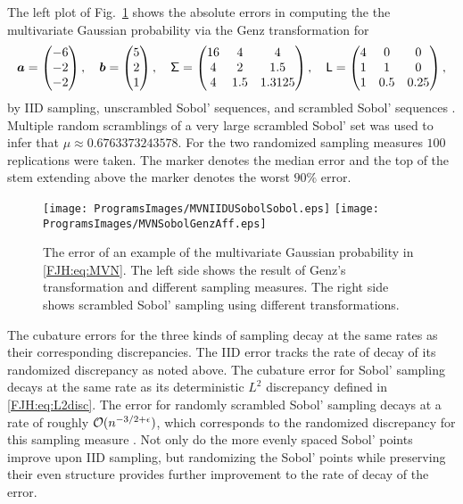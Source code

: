 \documentclass[graybox,footinfo]{svmult}
\begin{document}
The left plot of Fig.\ \ref{FJH:fig:MVNfig} shows the absolute errors in computing the the 
multivariate 
Gaussian probability via the Genz transformation for 
\[
   {\boldsymbol{a}}  = \begin{pmatrix}
   -6 \\ -2 \\ -2
   \end{pmatrix}, \quad
      {\boldsymbol{b}}  = \begin{pmatrix}
   5 \\ 2 \\ 1
   \end{pmatrix}, \quad
   \mathsf{\Sigma} = \begin{pmatrix} 16 & 4 & 4 \\ 4 &  2 &  1.5 \\
  4 & 1.5 &  1.3125 \end{pmatrix}, \quad
   \mathsf{L} = \begin{pmatrix} 4 & 0 & 0 \\ 1 &  1 &  0 \\
1 & 0.5 &  0.25 \end{pmatrix}, 
\]
by IID sampling, unscrambled Sobol' sequences, and scrambled Sobol' sequences   
\cite{Owe95, Owe98c}.
Multiple random scramblings of a very large scrambled Sobol' set was used to infer that 
$\mu \approx 0.6763373243578$.   For the two randomized sampling measures $100$ 
replications were taken.  The marker denotes the median error and the top of the stem 
extending above the marker denotes the worst $90\%$ error.

\begin{figure}
	\centering
	\texttt{[image: ProgramsImages/MVNIIDUSobolSobol.eps]} 
	\qquad 
	\texttt{[image: ProgramsImages/MVNSobolGenzAff.eps]}
	\caption{The error of an example of the multivariate Gaussian probability in 
	\eqref{FJH:eq:MVN}.  The left side shows the result of Genz's transformation and 
	different sampling measures.  The right side shows scrambled Sobol' sampling
	using different transformations.
	\label{FJH:fig:MVNfig}}
\end{figure}

The cubature errors for the three kinds of sampling decay at the same rates as their 
corresponding discrepancies.  The IID error tracks the rate of decay of its randomized 
discrepancy as noted above.  The cubature  error for  Sobol' 
sampling decays at the same rate as its deterministic $L^2$ discrepancy defined in 
\eqref{FJH:eq:L2disc}.  The error for randomly scrambled Sobol' 
sampling decays at a rate of roughly ${\mathcal{O}}(n^{-3/2+\epsilon})$, which corresponds to 
the randomized discrepancy for this sampling measure \cite{HeiHicYue02a,Owe97}.  
Not only do the more evenly spaced Sobol' points improve upon IID sampling, but 
randomizing the Sobol' points while preserving their even structure provides further 
improvement to the rate of decay of the error.
\end{document}
